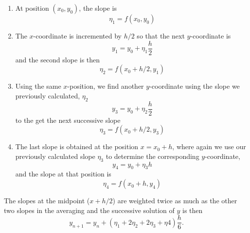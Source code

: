 \documentclass[12pt, manuscript]{article}
\begin{document}
    \begin{enumerate}
        \item
            At position $(x_0, y_0)$, the slope is 
            \begin{equation}\label{eq:slope1}
                \eta_1 = f(x_0, y_0)
            \end{equation}
        \item
            The $x$-coordinate is incremented by $h/2$ so that the next $y$-coordinate is 
            \begin{equation}
                y_1 = y_0 + \eta_1\frac{h}{2}
            \end{equation}
            and the second slope is then 
            \begin{equation}\label{eq:slope2}
                \eta_2 = f(x_0 + h/2, y_1)
            \end{equation}
        \item
            Using the same $x$-position, we find another $y$-coordinate using the slope we previously calculated, $\eta_2$
            \begin{equation}
                y_3 = y_0 + \eta_2\frac{h}{2}
            \end{equation}
            to the get the next successive slope
            \begin{equation}\label{eq:slope3}
                \eta_3 = f(x_0 + h/2, y_3)
            \end{equation}
        \item
            The last slope is obtained at the position $x = x_0 + h$, where again we use our previously calculated slope $\eta_3$ to determine the corresponding $y$-coordinate,
            \begin{equation}
                y_4 = y_0 + \eta_3h
            \end{equation}
            and the slope at that position is
            \begin{equation}\label{eq:slope4}
                \eta_4 = f(x_0 + h, y_4)
            \end{equation}
    \end{enumerate}
        The slopes at the midpoint ($x+h/2$) are weighted twice as much as the other two slopes in the averaging and the successive solution of $y$ is then
            \begin{equation}
                y_{n+1} = y_n + \left(\eta_1+2\eta_2+2\eta_3+\eta4\right)\frac{h}{6}.
            \end{equation}
   
\end{document}
